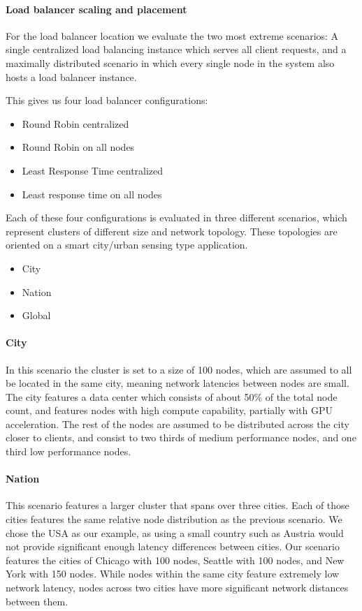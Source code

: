 \paragraph{Load balancer scaling and placement}
For the load balancer location we evaluate the two most extreme scenarios: A single centralized load balancing instance which serves all client requests, and a maximally distributed scenario in which every single node in the system also hosts a load balancer instance.

This gives us four load balancer configurations:
\begin{itemize}
    \item Round Robin centralized
    \item Round Robin on all nodes
    \item Least Response Time centralized
    \item Least response time on all nodes
\end{itemize}

Each of these four configurations is evaluated in three different scenarios, which represent clusters of different size and network topology.
These topologies are oriented on a smart city/urban sensing type application.
\begin{itemize}
    \item City
    \item Nation
    \item Global
\end{itemize}
\paragraph{City}
In this scenario the cluster is set to a size of 100 nodes, which are assumed to all be located in the same city, meaning network latencies between nodes are small.
The city features a data center which consists of about 50\% of the total node count, and features nodes with high compute capability, partially with GPU acceleration.
The rest of the nodes are assumed to be distributed across the city closer to clients, and consist to two thirds of medium performance nodes, and one third low performance nodes.
\paragraph{Nation}
This scenario features a larger cluster that spans over three cities.
Each of those cities features the same relative node distribution as the previous scenario.
We chose the USA as our example, as using a small country such as Austria would not provide significant enough latency differences between cities.
Our scenario features the cities of Chicago with 100 nodes, Seattle with 100 nodes, and New York with 150 nodes.
While nodes within the same city feature extremely low network latency, nodes across two cities have more significant network distances between them.

